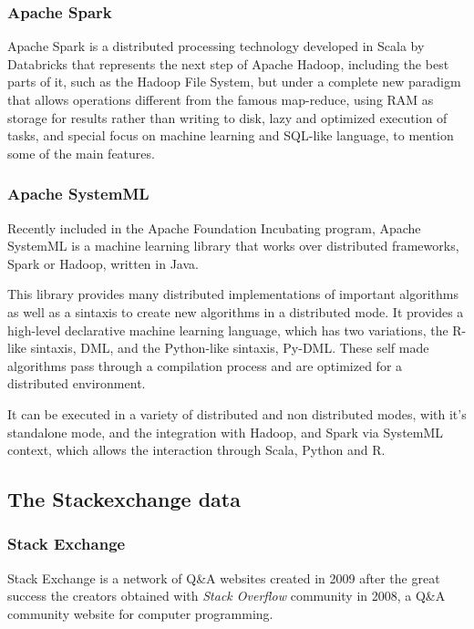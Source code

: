 \documentclass[11pt]{article} %
\begin{document}
  \subsubsection{Apache Spark}

    Apache Spark is a distributed processing technology developed in Scala by Databricks that represents the next step of Apache Hadoop, including the best parts of it, such as the Hadoop File System, but under a complete new paradigm that allows operations different from the famous map-reduce, using RAM as storage for results rather than writing to disk, lazy and optimized execution of tasks, and special focus on machine learning and SQL-like language, to mention some of the main features.

  \subsubsection{Apache SystemML}

    Recently included in the Apache Foundation Incubating  program, Apache SystemML is a machine learning library that works over distributed frameworks, Spark or Hadoop, written in Java.

    This library provides many distributed implementations of important algorithms as well as a sintaxis to create new algorithms in a distributed mode. It provides a high-level declarative machine learning language, which has two variations, the R-like sintaxis, DML, and the Python-like sintaxis, Py-DML. These self made algorithms pass through a compilation process and are optimized for a distributed environment.

    It can be executed in a variety of distributed and non distributed modes, with it's standalone mode, and the integration with Hadoop, and Spark via SystemML context, which allows the interaction through Scala, Python and R.


  \subsection{The Stackexchange data}

    \subsubsection{Stack Exchange}

    Stack Exchange is a network of Q\&A websites created in 2009 after the great success the creators obtained with \emph{Stack Overflow} community in 2008, a Q\&A community website for computer programming.
\end{document}
